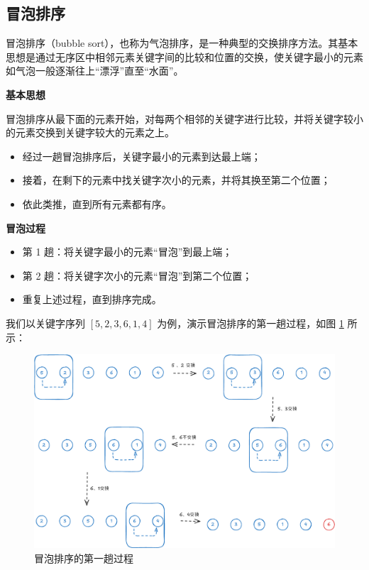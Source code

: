 \documentclass[lang=cn,newtx,10pt,scheme=chinese]{../elegantbook}
\begin{document}
\subsection{冒泡排序}

冒泡排序（bubble sort），也称为气泡排序，是一种典型的交换排序方法。其基本思想是通过无序区中相邻元素关键字间的比较和位置的交换，使关键字最小的元素如气泡一般逐渐往上“漂浮”直至“水面”。


\textbf{基本思想}  

冒泡排序从最下面的元素开始，对每两个相邻的关键字进行比较，并将关键字较小的元素交换到关键字较大的元素之上。  
\begin{itemize}
  \item 经过一趟冒泡排序后，关键字最小的元素到达最上端；
  \item 接着，在剩下的元素中找关键字次小的元素，并将其换至第二个位置；
  \item 依此类推，直到所有元素都有序。
\end{itemize}

\textbf{冒泡过程}  

\begin{itemize}
  \item 第 1 趟：将关键字最小的元素“冒泡”到最上端；
  \item 第 2 趟：将关键字次小的元素“冒泡”到第二个位置；
  \item 重复上述过程，直到排序完成。
\end{itemize}

我们以关键字序列 $[5, 2, 3,6,1,4]$ 为例，演示冒泡排序的第一趟过程，如图 \ref{fig:bubbleSort} 所示：

\begin{figure}[!htbp]
    \centering
    \includegraphics[width=1\textwidth]{./figure/pdf/cropped/bubbleSort.pdf}
    \caption{冒泡排序的第一趟过程}
    \label{fig:bubbleSort}
\end{figure}
\end{document}
